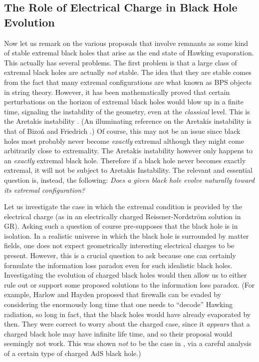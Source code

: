 \documentclass[12pt]{article}
\newcommand{\2}{$^2$}
\newcommand{\3}{$^3$}
\newcommand{\4}{$_4$}
\newcommand{\5}{$_5$}
\begin{document}
\subsection{The Role of Electrical Charge in Black Hole Evolution}\label{concluding remarks}

Now let us remark on the various proposals that involve remnants as some kind of stable extremal black holes that arise as the end state of Hawking evaporation. This actually has several problems. The first problem is that a large class of extremal black holes are actually \emph{not} stable. The idea that they are stable comes from the fact that many extremal configurations are what known as BPS objects in string theory. However, it has been mathematically proved that certain perturbations on the horizon of extremal black holes would blow up in a finite time, signaling the instability of the geometry, even at the \emph{classical} level. This is the Aretakis instability \cite{1110.2006, 1206.6598, 1208.1437, 1307.6800}.  (An illuminating reference on the Aretakis instability is that of Bizo\'n and Friedrich \cite{1212.0729}.) Of course, this may not be an issue since black holes most probably never become \emph{exactly} extremal although they might come arbitrarily close to extremality. The Aretakis instability however only happens to an \emph{exactly} extremal black hole. Therefore if a black hole never becomes exactly extremal, it will not be subject to Aretakis Instability. 
The relevant and essential question is, instead, the following: \emph{Does a given black hole evolve naturally toward its extremal configuration?} 

Let us investigate the case in which the extremal condition is provided by the electrical charge (as in an electrically charged Reissner-Nordstr\"om solution in GR). 
Asking such a question of course pre-supposes that the black hole is in isolation. In a realistic universe in which the black hole is surrounded by matter fields, one does not expect  geometrically interesting electrical charges to be present. However, this is a crucial question to ask because one can certainly formulate the information loss paradox even for such idealistic black holes. Investigating the evolution of charged black holes would then allow us to either rule out or support some proposed solutions to the information loss paradox. (For example, Harlow and Hayden \cite{HH} proposed that firewalls can be evaded by considering the enormously long time that one needs to ``decode'' Hawking radiation, so long in fact, that the black holes would have already evaporated by then. They were correct to worry about the charged case, since it \emph{appears} that a charged black hole may have infinite life time, and so their proposal would seemingly not work. This was shown \emph{not} to be the case in \cite{OMC}, via a careful analysis of a certain type of charged AdS black hole.)
\end{document}
